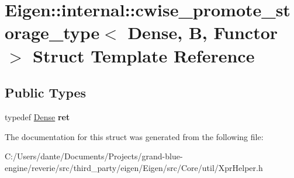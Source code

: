 \hypertarget{struct_eigen_1_1internal_1_1cwise__promote__storage__type_3_01_dense_00_01_b_00_01_functor_01_4}{}\section{Eigen\+::internal\+::cwise\+\_\+promote\+\_\+storage\+\_\+type$<$ Dense, B, Functor $>$ Struct Template Reference}
\label{struct_eigen_1_1internal_1_1cwise__promote__storage__type_3_01_dense_00_01_b_00_01_functor_01_4}
\subsection*{Public Types}
\begin{DoxyCompactItemize}
\item 
\mbox{\label{struct_eigen_1_1internal_1_1cwise__promote__storage__type_3_01_dense_00_01_b_00_01_functor_01_4_a52f753cb452c8c3fb80554a58de1abab}} 
typedef \mbox{\hyperlink{struct_eigen_1_1_dense}{Dense}} {\bfseries ret}
\end{DoxyCompactItemize}


The documentation for this struct was generated from the following file\+:\begin{DoxyCompactItemize}
\item 
C\+:/\+Users/dante/\+Documents/\+Projects/grand-\/blue-\/engine/reverie/src/third\+\_\+party/eigen/\+Eigen/src/\+Core/util/Xpr\+Helper.\+h\end{DoxyCompactItemize}
